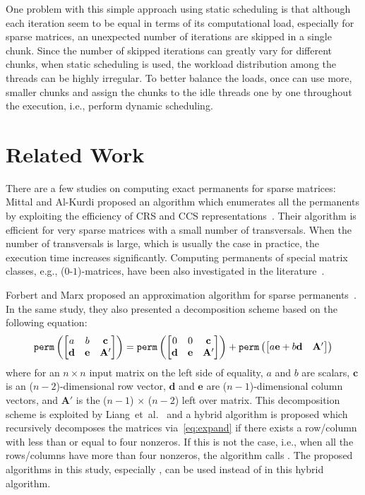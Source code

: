 \documentclass{elektr}
\begin{document}
{One problem with this simple approach using static scheduling is that although each iteration seem to be equal in terms of its computational load, especially for sparse matrices, an unexpected number of iterations are skipped in a single chunk. Since the number of skipped iterations can greatly vary for different chunks,  when static scheduling is used, the workload distribution among the threads can be highly irregular. To better balance the loads, once can use more, smaller chunks and assign the chunks to the idle threads one by one throughout the execution, i.e., perform dynamic scheduling. 

\section{Related Work}\label{sec:rel}

There are a few studies on computing exact permanents for sparse matrices: Mittal and Al-Kurdi proposed an algorithm which  enumerates all the permanents by exploiting the efficiency of CRS and CCS representations~\cite{mittal01}. Their algorithm is efficient for very sparse matrices with a small number of transversals. When the number of transversals is large, which is usually the case in practice, the execution time increases significantly. Computing permanents of special matrix classes, e.g., ($0$-$1$)-matrices, have been also investigated in the literature~\cite{bax08}.

Forbert and Marx proposed an approximation algorithm for sparse permanents~\cite{forbert03}. In the same study, they also presented a decomposition scheme based on the following equation:
\begin{equation}
{\tt perm}
\left(
\begin{bmatrix}
    a    & b& \mathbf{c} \\
  \mathbf{d}      & \mathbf{e} & \mathbf{A'} 
\end{bmatrix}
\right)
=
{\tt perm}
\left(\begin{bmatrix}
     0   & 0& \mathbf{c} \\
  \mathbf{d}      & \mathbf{e} & \mathbf{A'}
  \end{bmatrix}
\right)
+
{\tt perm}
\left(
\begin{bmatrix}
    a\mathbf{e}  + b\mathbf{d}  & \mathbf{A'} 
    \end{bmatrix}
\right)
\label{eq:expand}
\end{equation}
where for an $n \times n$ input matrix on the left side of equality, $a$ and $b$ are scalars, $\mathbf{c}$ is an ($n-2$)-dimensional row
vector, $\mathbf{d}$ and $\mathbf{e}$ are ($n-1$)-dimensional column vectors, and $\mathbf{A'}$ is the ($n - 1$) $\times$ ($n - 2$)  left over matrix. 
This decomposition scheme is exploited by Liang~et~al.~\cite{liang06} and a hybrid algorithm is proposed which
recursively decomposes the matrices via~\eqref{eq:expand} if there exists a row/column with less than or equal to four nonzeros. If this is
not the case, i.e., when all the rows/columns have more than four nonzeros, the algorithm calls {}. The proposed algorithms
in this study, especially {}, can be used instead of {} in this hybrid algorithm. 

}
\end{document}
